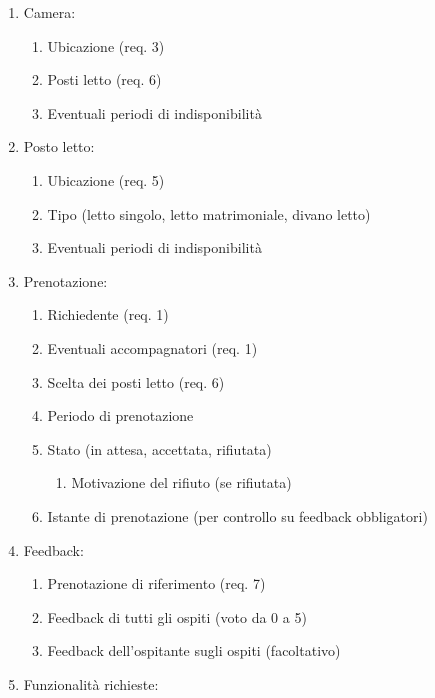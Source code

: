 \documentclass[a4paper,12pt]{report}
\begin{document}
\begin{enumerate}[label*=\arabic*.]
\begin{enumerate}[label*=\arabic*.]
        \end{enumerate}
      \item Camera:
        \begin{enumerate}[label*=\arabic*.]
          \item Ubicazione (req. 3)
          \item Posti letto (req. 6)
          \item Eventuali periodi di indisponibilità
        \end{enumerate}
      \newpage
      \item Posto letto:
        \begin{enumerate}[label*=\arabic*.]
          \item Ubicazione (req. 5)
          \item Tipo (letto singolo, letto matrimoniale, divano letto)
          \item Eventuali periodi di indisponibilità
        \end{enumerate}
      \item Prenotazione:
        \begin{enumerate}[label*=\arabic*.]
          \item Richiedente (req. 1)
          \item Eventuali accompagnatori (req. 1)
          \item Scelta dei posti letto (req. 6)
          \item Periodo di prenotazione
          \item Stato (in attesa, accettata, rifiutata)
            \begin{enumerate}[label*=\arabic*.]
              \item Motivazione del rifiuto (se rifiutata)
            \end{enumerate}
          \item Istante di prenotazione (per controllo su feedback obbligatori)
        \end{enumerate}
      \item Feedback:
        \begin{enumerate}[label*=\arabic*.]
          \item Prenotazione di riferimento (req. 7)
          \item Feedback di tutti gli ospiti (voto da 0 a 5)
          \item Feedback dell'ospitante sugli ospiti (facoltativo)
        \end{enumerate}
      \item Funzionalità richieste:

\end{enumerate}
\end{document}
